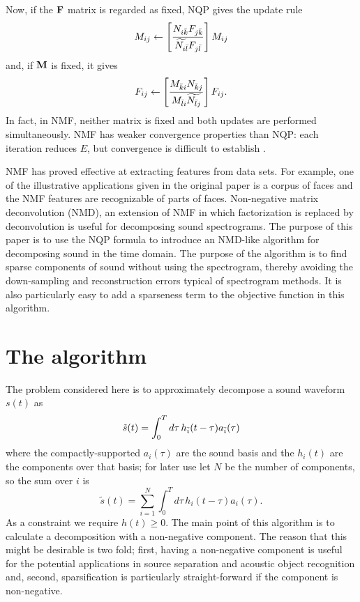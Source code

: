 \documentclass[11pt,twocolumn]{IEEEtran}
\begin{document}
Now, if the ${\bf F}$ matrix is regarded as fixed, NQP gives the update rule
\begin{equation}
M_{ij}\leftarrow\left[\frac{N_{i{\bar{k}}}F_{j{\bar{k}}}}{\widetilde{N_{i{\bar{l}}}}F_{j{\bar{l}}}}\right]M_{ij}
\end{equation}
and, if ${\bf M}$ is fixed, it gives
\begin{equation}
F_{ij}\leftarrow\left[\frac{M_{{\bar{k}} i}N_{{\bar{k}} j}}{M_{{\bar{l}} i}\widetilde{N_{{\bar{l}} j}}}\right]F_{ij}.
\end{equation}
In fact, in NMF, neither matrix is fixed and both updates are
performed simultaneously. NMF has weaker convergence properties than
NQP: each iteration reduces $E$, but convergence is difficult to
establish \cite{FinessoSpreij2004a, GonzalesZhang2005a, Lin2007a}.

NMF has proved effective at extracting features from data sets. For
example, one of the illustrative applications given in the original
paper \cite{LeeSeung1999a} is a corpus of faces and the NMF features are
recognizable of parts of faces. Non-negative matrix deconvolution
(NMD), an extension of NMF in which factorization is replaced by
deconvolution \cite{Smaragdis2004a} is useful for decomposing sound
spectrograms. The purpose of this paper is to use the NQP formula to
introduce an NMD-like algorithm for decomposing sound in the time
domain. The purpose of the algorithm is to find sparse components of
sound without using the spectrogram, thereby avoiding the
down-sampling and reconstruction errors typical of spectrogram
methods. It is also particularly easy to add a sparseness term to the
objective function in this algorithm.

\section{The algorithm}

The problem considered here is to approximately decompose a sound waveform $s(t)$ as
\begin{equation}
\tilde{s}(t)=\int_0^T d\tau\,h_{\bar{i}}(t-\tau)a_{\bar{i}}(\tau)
\end{equation}
where the compactly-supported $a_i(\tau)$ are the sound basis and the
$h_i(t)$ are the components over that basis; for later use let $N$ be
the number of components, so the sum over $i$ is
\begin{equation}
\tilde{s}(t)=\sum_{i=1}^N\int_0^T d\tau\,h_i(t-\tau)a_i(\tau).
\end{equation}
As a constraint we require $h(t)\ge 0$. The main point of this
algorithm is to calculate a decomposition with a non-negative component.
The reason that this might be desirable is two fold; first, having a
non-negative component is useful for the potential applications in source
separation and acoustic object recognition and, second, sparsification
is particularly straight-forward if the component is non-negative. 
\end{document}
